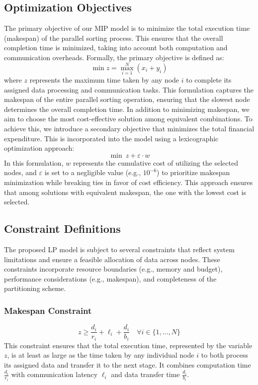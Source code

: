 \documentclass[]{interact}
\theoremstyle{plain}
\theoremstyle{definition}
\theoremstyle{remark}
\begin{document}
\subsection{Optimization Objectives}
The primary objective of our MIP model is to minimize the total execution time (makespan) of the parallel sorting process. This ensures that the overall completion time is minimized, taking into account both computation and communication overheads. Formally, the primary objective is defined as:
\begin{equation}
    \min z = \max_{i=1}^N (x_i + y_i)
\end{equation}
where $z$ represents the maximum time taken by any node $i$ to complete its assigned data processing and communication tasks. This formulation captures the makespan of the entire parallel sorting operation, ensuring that the slowest node determines the overall completion time. In addition to minimizing makespan, we aim to choose the most cost-effective solution among equivalent combinations. To achieve this, we introduce a secondary objective that minimizes the total financial expenditure. This is incorporated into the model using a lexicographic optimization approach:
\begin{equation}
    \min \ z + \varepsilon \cdot w
\end{equation}
In this formulation, $w$ represents the cumulative cost of utilizing the selected nodes, and $\varepsilon$ is set to a negligible value (e.g., $10^{-6}$) to prioritize makespan minimization while breaking ties in favor of cost efficiency. This approach ensures that among solutions with equivalent makespan, the one with the lowest cost is selected.

\subsection{Constraint Definitions}

The proposed LP model is subject to several constraints that reflect system limitations and ensure a feasible allocation of data across nodes. These constraints incorporate resource boundaries (e.g., memory and budget), performance considerations (e.g., makespan), and completeness of the partitioning scheme.

\subsubsection{Makespan Constraint}
\begin{equation}
    z \geq \frac{d_i}{r_i} + \ell_i + \frac{d_i}{b_i} \quad \forall i \in \{1, \ldots, N\}
\end{equation}
This constraint ensures that the total execution time, represented by the variable $z$, is at least as large as the time taken by any individual node $i$ to both process its assigned data and transfer it to the next stage. It combines computation time $\frac{d_i}{r_i}$ with communication latency $\ell_i$ and data transfer time $\frac{d_i}{b_i}$.
\end{document}
